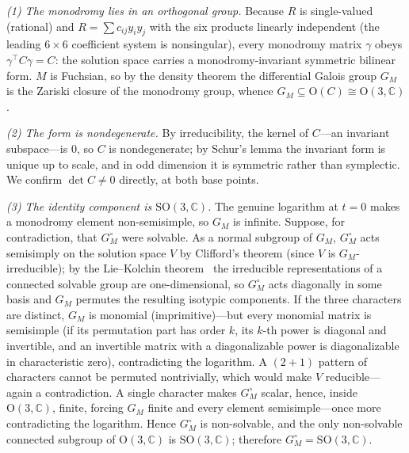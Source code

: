 \documentclass[cntp]{ipart}
\theoremstyle{plain}
\theoremstyle{remark}
\begin{document}
\emph{(1) The monodromy lies in an orthogonal group.} Because $R$ is single-valued (rational) and
$R=\sum c_{ij}y_iy_j$ with the six products linearly independent (the leading $6\times6$ coefficient system is
nonsingular), every monodromy matrix $\gamma$ obeys $\gamma^{\!\top}C\gamma=C$: the solution space carries a
monodromy-invariant symmetric bilinear form. $M$ is Fuchsian, so by the density theorem the differential Galois
group $G_M$ is the Zariski closure of the monodromy group, whence $G_M\subseteq\mathrm{O}(C)\cong\mathrm{O}(3,\mathbb{C})$.

\emph{(2) The form is nondegenerate.} By irreducibility, the kernel of $C$---an invariant subspace---is $0$, so $C$
is nondegenerate; by Schur's lemma the invariant form is unique up to scale, and in odd dimension it is symmetric
rather than symplectic. We confirm $\det C\neq0$ directly, at both base points.

\emph{(3) The identity component is $\mathrm{SO}(3,\mathbb{C})$.} The genuine logarithm at $t=0$ makes a monodromy
element non-semisimple, so $G_M$ is infinite. Suppose, for contradiction, that $G_M^\circ$ were solvable. As a normal
subgroup of $G_M$, $G_M^\circ$ acts semisimply on the solution space $V$ by Clifford's theorem (since $V$ is
$G_M$-irreducible); by the Lie--Kolchin theorem~\cite{vdPutSinger} the irreducible representations of a connected solvable group are
one-dimensional, so $G_M^\circ$ acts diagonally in some basis and $G_M$ permutes the resulting isotypic components. If
the three characters are distinct, $G_M$ is monomial (imprimitive)---but every monomial matrix is semisimple (if its
permutation part has order $k$, its $k$-th power is diagonal and invertible, and an invertible matrix with a
diagonalizable power is diagonalizable in characteristic zero), contradicting the logarithm. A $(2{+}1)$ pattern of
characters cannot be permuted nontrivially, which would make $V$ reducible---again a contradiction. A single
character makes $G_M^\circ$ scalar, hence, inside $\mathrm{O}(3,\mathbb{C})$, finite, forcing $G_M$ finite and every
element semisimple---once more contradicting the logarithm. Hence $G_M^\circ$ is non-solvable, and the only
non-solvable connected subgroup of $\mathrm{O}(3,\mathbb{C})$ is $\mathrm{SO}(3,\mathbb{C})$; therefore
$G_M^\circ=\mathrm{SO}(3,\mathbb{C})$.
\end{document}
